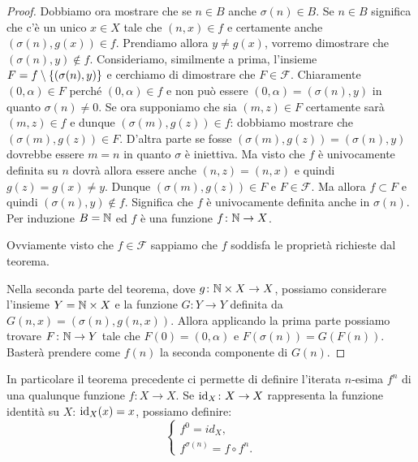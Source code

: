 \begin{proof}
Dobbiamo ora mostrare che se $n\in B$ anche $\sigma(n)\in B$.
Se $n\in B$ significa che c'è un unico $x\in X$ tale che $(n,x)\in f$
e certamente anche $(\sigma(n),g(x))\in f$.
Prendiamo allora $y\neq g(x)$, vorremo dimostrare che $(\sigma(n),y)\not \in f$.
Consideriamo, similmente a prima, l'insieme $F=f\setminus{\left\{ (\sigma(n),y) \right\}}$
e cerchiamo di dimostrare che $F\in \mathcal F$.
Chiaramente $(0,\alpha)\in F$ perché $(0,\alpha)\in f$ 
e non può essere $(0,\alpha)=(\sigma(n),y)$ in quanto $\sigma(n)\neq 0$.
Se ora supponiamo che sia $(m,z)\in F$ certamente sarà $(m,z)\in f$ 
e dunque $(\sigma(m),g(z))\in f$: 
dobbiamo mostrare che $(\sigma(m),g(z))\in F$. 
D'altra parte se fosse $(\sigma(m), g(z))=(\sigma(n),y)$ 
dovrebbe essere $m=n$ in quanto $\sigma$ è iniettiva. 
Ma visto che $f$ è univocamente definita su $n$ dovrà allora essere 
anche $(n,z) = (n,x)$ e quindi $g(z)=g(x) \neq y$. 
Dunque $(\sigma(m),g(z))\in F$ e $F\in \mathcal F$.
Ma allora $f\subset F$ e quindi $(\sigma(n),y)\not \in f$.
Significa che $f$ è univocamente definita anche in $\sigma(n)$.
Per induzione $B={\mathbb N}$ ed $f$ è una funzione $f\colon {\mathbb N}\to X$.

Ovviamente visto che $f\in \mathcal F$ sappiamo che $f$ 
soddisfa le proprietà richieste dal teorema.

Nella seconda parte del teorema, dove $g\colon {\mathbb N}\times X \to X$,
possiamo considerare l'insieme $Y={\mathbb N}\times X$ e la funzione 
$G\colon Y\to Y$ definita da $G(n,x) = (\sigma(n), g(n,x))$.
Allora applicando la prima parte possiamo trovare $F\colon {\mathbb N}\to Y$
tale che $F(0) = (0,\alpha)$ e $F(\sigma(n)) = G(F(n))$.
Basterà prendere come $f(n)$ la seconda componente di $G(n)$.
\end{proof}
  
In particolare il teorema precedente ci permette di definire l'iterata $n$-esima $f^n$ 
di una qualunque funzione $f\colon X\to X$.
Se $\mathrm{id}_X\colon X\to X$ rappresenta la funzione identità su $X$:
$\mathrm{id}_X(x)=x$,
possiamo definire:
%
%
%
\begin{equation}\label{def:iterata}
  \begin{cases}
    f^0 = id_X,\\
    f^{\sigma(n)} = f\circ f^n.
  \end{cases}
\end{equation}

